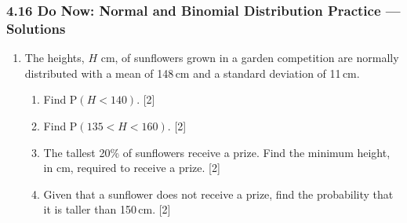 \documentclass[12pt, twoside]{article}
\begin{document}
\subsubsection*{4.16 Do Now: Normal and Binomial Distribution Practice --- Solutions}
\begin{enumerate}[itemsep=0.1cm]

\item The heights, $H$ cm, of sunflowers grown in a garden competition are normally distributed
with a mean of 148\,cm and a standard deviation of 11\,cm.

\begin{enumerate}[itemsep=0.25cm]
    \item Find $\mathrm{P}(H < 140)$. \hfill [2]
    \item Find $\mathrm{P}(135 < H < 160)$. \hfill [2]
    \item The tallest 20\% of sunflowers receive a prize. Find the minimum height, in cm,
    required to receive a prize. \hfill [2]
    \item Given that a sunflower does not receive a prize, find the probability that it is
    taller than 150\,cm. \hfill [2]
\end{enumerate}

\vspace{1cm}

\noindent{}

\newpage


\end{enumerate}
\end{document}
